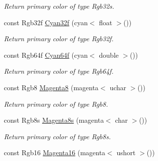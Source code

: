 \begin{DoxyCompactItemize}
\begin{DoxyCompactList}\small\item\em Return primary color of type Rgb32s. \end{DoxyCompactList}\item 
\hypertarget{group___primary_colors_gabaf314b3ee2b4ae65c7a354863cbfd6b}{const Rgb32f \hyperlink{group___primary_colors_gabaf314b3ee2b4ae65c7a354863cbfd6b}{Cyan32f} (cyan$<$ float $>$())}\label{group___primary_colors_gabaf314b3ee2b4ae65c7a354863cbfd6b}

\begin{DoxyCompactList}\small\item\em Return primary color of type Rgb32f. \end{DoxyCompactList}\item 
\hypertarget{group___primary_colors_ga353d007048893d08d591e4eaa969b46e}{const Rgb64f \hyperlink{group___primary_colors_ga353d007048893d08d591e4eaa969b46e}{Cyan64f} (cyan$<$ double $>$())}\label{group___primary_colors_ga353d007048893d08d591e4eaa969b46e}

\begin{DoxyCompactList}\small\item\em Return primary color of type Rgb64f. \end{DoxyCompactList}\item 
\hypertarget{group___primary_colors_gabca9322c3cae7e86da44a0393b18d600}{const Rgb8 \hyperlink{group___primary_colors_gabca9322c3cae7e86da44a0393b18d600}{Magenta8} (magenta$<$ uchar $>$())}\label{group___primary_colors_gabca9322c3cae7e86da44a0393b18d600}

\begin{DoxyCompactList}\small\item\em Return primary color of type Rgb8. \end{DoxyCompactList}\item 
\hypertarget{group___primary_colors_ga3908ec25531764a56fd1664bc01b1a54}{const Rgb8s \hyperlink{group___primary_colors_ga3908ec25531764a56fd1664bc01b1a54}{Magenta8s} (magenta$<$ char $>$())}\label{group___primary_colors_ga3908ec25531764a56fd1664bc01b1a54}

\begin{DoxyCompactList}\small\item\em Return primary color of type Rgb8s. \end{DoxyCompactList}\item 
\hypertarget{group___primary_colors_gace5f3326104eb0c4d907033f06aca9e8}{const Rgb16 \hyperlink{group___primary_colors_gace5f3326104eb0c4d907033f06aca9e8}{Magenta16} (magenta$<$ ushort $>$())}\label{group___primary_colors_gace5f3326104eb0c4d907033f06aca9e8}


\end{DoxyCompactItemize}
